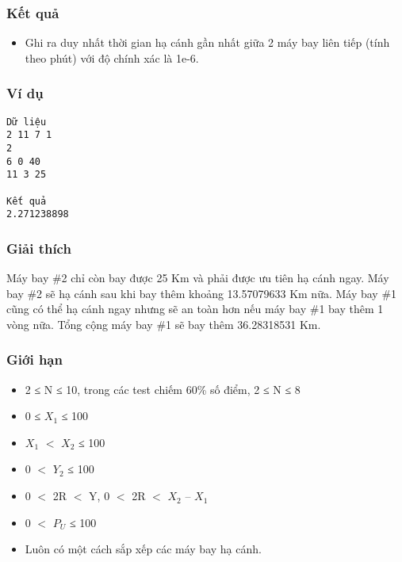 \subsubsection{   Kết quả  }
\begin{itemize}
	\item     Ghi ra duy nhất thời gian hạ cánh gần nhất giữa 2 máy bay liên tiếp (tính theo phút) với độ chính xác là 1e-6.   
\end{itemize}

\subsubsection{   Ví dụ  }
\begin{verbatim}
Dữ liệu
2 11 7 1
2
6 0 40
11 3 25	

Kết quả
2.271238898
\end{verbatim}

\subsubsection{   Giải thích  }

   Máy bay \#2 chỉ còn bay được 25 Km và phải được ưu tiên hạ cánh ngay. Máy bay \#2 sẽ hạ cánh sau khi bay thêm khoảng 13.57079633 Km nữa. Máy bay \#1 cũng có thể hạ cánh ngay nhưng sẽ an toàn hơn nếu máy bay \#1 bay thêm 1 vòng nữa. Tổng cộng máy bay \#1 sẽ bay thêm 36.28318531 Km.  

\subsubsection{   Giới hạn  }
\begin{itemize}
	\item     2 ≤ N ≤ 10, trong các test chiếm 60\% số điểm, 2 ≤ N ≤ 8   
	\item     0 ≤ $X_{1}$    ≤ 100   
	\item     $X_{1}$    $<$ $X_{2}$    ≤ 100   
	\item     0 $<$ $Y_{2}$    ≤ 100   
	\item     0 $<$ 2R $<$ Y, 0 $<$ 2R $<$ $X_{2}$    – $X_{1}$
	\item     0 $<$ $P_{U}$    ≤ 100   
	\item     Luôn có một cách sắp xếp các máy bay hạ cánh.   
\end{itemize}

